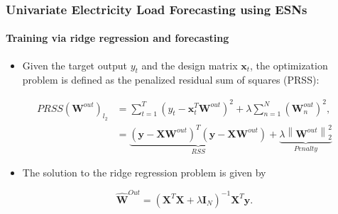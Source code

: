 \documentclass[aspectratio=169]{beamer}
\begin{document}
\begin{frame}
\frametitle{Univariate Electricity Load Forecasting using ESNs}
\framesubtitle{\large Training via ridge regression and forecasting}

\begin{itemize}
\item Given the target output $y_{t}$ and the design matrix $\mathbf{x}_{t}$, the optimization problem is defined as the penalized residual sum of squares (PRSS):
\end{itemize}

\begin{subequations}
\begin{align}
PRSS(\mathbf{W}^{out})_{l_2} &= \sum\limits_{t = 1}^T {{{\left( {y_{t} - {\mathbf{x}_{t}^T}{\mathbf{W}^{out}}} \right)}^2}} + \lambda \sum\limits_{n = 1}^N {{{\left( {\mathbf{W}_n^{out}} \right)}^2}}, \\
&= \underbrace {{{\left( {\mathbf{y} - \mathbf{X}{\mathbf{W}^{out}}} \right)}^T}\left( {\mathbf{y} - \mathbf{X}{\mathbf{W}^{out}}} \right)}_{RSS} + \underbrace {\lambda \left\| {{\mathbf{W}^{out}}} \right\|_2^2}_{Penalty} \label{eq:problem}
\end{align}
\end{subequations}

\begin{itemize}
\item The solution to the ridge regression problem is given by
\end{itemize}

\begin{equation}
\mathbf{\hat{W}}^{Out} = (\mathbf{X}^T\mathbf{X} + \lambda\mathbf{I}_N)^{-1}\mathbf{X}^{T}\mathbf{y}.
\label{estimator}
\end{equation}

\end{frame}
\end{document}
